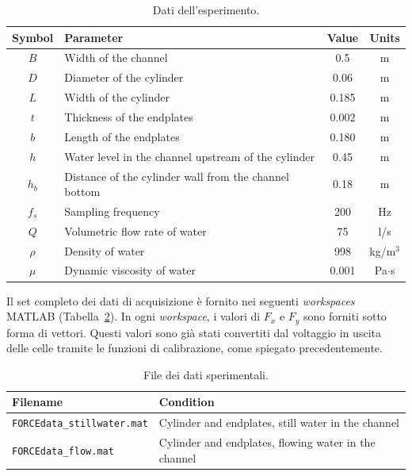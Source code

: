 \begin{table}[H]
    \centering
    \begin{tabular}{clcc}
        \toprule
        \textbf{Symbol} & \textbf{Parameter} & \textbf{Value} & \textbf{Units}  \\
        \midrule
        $B$ & Width of the channel & 0.5 & m    \\
        $D$ & Diameter of the cylinder & 0.06 & m \\
        $L$ & Width of the cylinder & 0.185 & m \\
        $t$ & Thickness of the endplates & 0.002 & m \\
        $b$ & Length of the endplates & 0.180 & m \\
        $h$ & Water level in the channel upstream of the cylinder & 0.45 & m \\
        $h_b$ & Distance of the cylinder wall from the channel bottom & 0.18 & m \\
        $f_s$ & Sampling frequency & 200 & Hz \\
        $Q$ & Volumetric flow rate of water & 75 & l/s \\
        $\rho$ & Density of water & 998 & kg/m$^3$  \\
        $\mu$ & Dynamic viscosity of water & 0.001 & Pa$\cdot$s \\
        \bottomrule
    \end{tabular}
    \caption{Dati dell'esperimento.}
    \label{tab:tab5-dati}
\end{table}

Il set completo dei dati di acquisizione è fornito nei seguenti \emph{workspaces} MATLAB (Tabella~\ref{tab:tab5-work}). In ogni \emph{workspace}, i valori di $F_x$ e $F_y$ sono forniti sotto forma di vettori. Questi valori sono già stati convertiti dal voltaggio in uscita delle celle tramite le funzioni di calibrazione, come spiegato precedentemente.

\begin{table}[H]
    \centering
    \begin{tabular}{ll}
        \toprule
        \textbf{Filename} & \textbf{Condition} \\
        \midrule
        \texttt{FORCEdata\_stillwater.mat} & Cylinder and endplates, still water in the channel \\
        \texttt{FORCEdata\_flow.mat} & Cylinder and endplates, flowing water in the channel \\
        \bottomrule
    \end{tabular}
    \caption{File dei dati sperimentali.}
    \label{tab:tab5-work}
\end{table}


